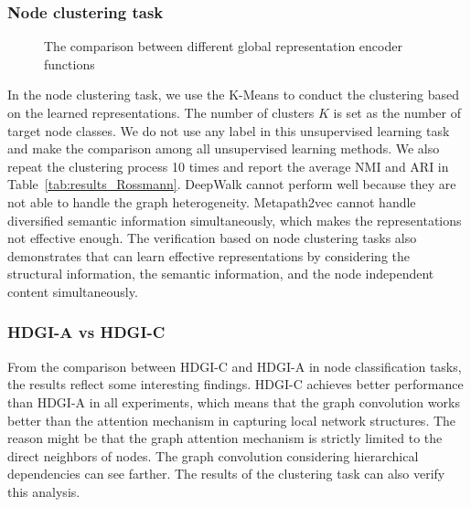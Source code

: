 \documentclass[conference]{IEEEtran}
\begin{document}
	\subsubsection{Node clustering task}
\begin{figure}[t]
\centering
{}
\caption{The comparison between different global representation encoder functions}\label{fig:global_function}
\end{figure}
In the node clustering task, we use the K-Means to conduct the clustering based on the learned representations. The number of clusters $K$ is set as the number of target node classes. We do not use any label in this unsupervised learning task and make the comparison among all unsupervised learning methods. We also repeat the clustering process 10 times and report the average NMI and ARI in Table~\ref{tab:results_Rossmann}. DeepWalk cannot perform well because they are not able to handle the graph heterogeneity. Metapath2vec cannot handle diversified semantic information simultaneously, which makes the representations not effective enough. The verification based on node clustering tasks also demonstrates that {\our} can learn effective representations by considering the structural information, the semantic information, and the node independent content simultaneously.
	
\subsubsection{HDGI-A vs HDGI-C}
From the comparison between HDGI-C and HDGI-A in node classification tasks, the results reflect some interesting findings. HDGI-C achieves better performance than HDGI-A in all experiments, which means that the graph convolution works better than the attention mechanism in capturing local network structures. The reason might be that the graph attention mechanism is strictly limited to the direct neighbors of nodes. The graph convolution considering hierarchical dependencies can see farther. The results of the clustering task can also verify this analysis.
\end{document}
